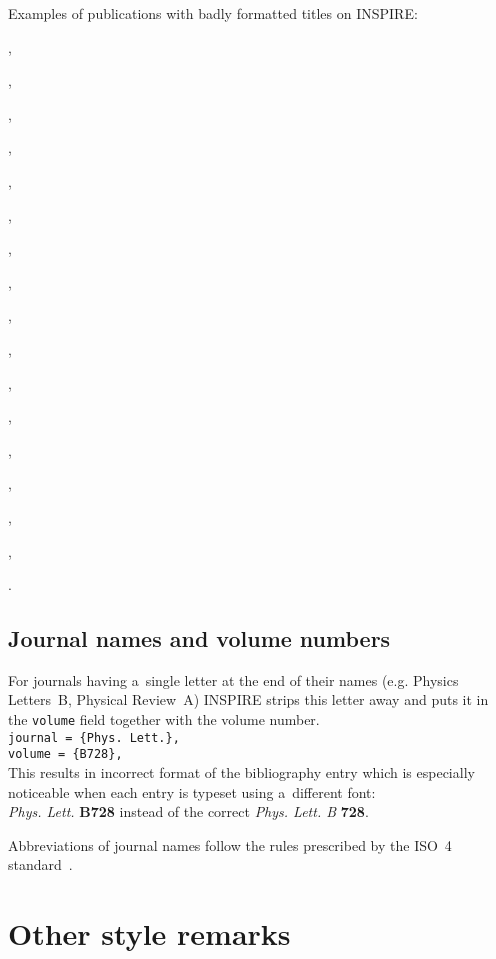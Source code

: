 \documentclass[12pt,a4paper]{article}
\begin{document}
Examples of publications with badly formatted titles on INSPIRE:

,

,

,

,

,

,

,

,

,

,

,

,

,

,

,

,

.

\subsection{Journal names and volume numbers}

For journals having a~single letter at the end of their names (e.g. Physics Letters~B, Physical Review~A) INSPIRE strips this letter away and puts it in the \verb_volume_ field together with the volume number.\\
\verb_journal = {Phys. Lett.},_ \\
\verb_volume = {B728},_\\
This results in incorrect format of the bibliography entry which is especially noticeable when each entry is typeset using a~different font:\\
\textit{Phys. Lett.} \textbf{B728} instead of the correct \textit{Phys. Lett. B} \textbf{728}.

Abbreviations of journal names follow the rules prescribed by the ISO~4 standard~\cite{iso-4}.


\section{Other style remarks}
\end{document}
